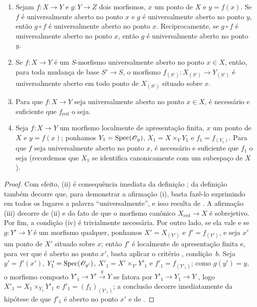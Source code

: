 \begin{proposition}[14.3.4]
\label{IV.14.3.4}
\begin{enumerate}[label=(\roman*)]
  \item Sejam $f:X\to Y$ e $g:Y\to Z$ dois morfismos, $x$ um ponto de $X$ e $y=f(x)$.
  Se $f$ é universalmente aberto no ponto $x$ e $g$ é universalmente aberto no ponto $y$, então $g\circ f$ é universalmente aberto no ponto $x$.
  Reciprocamente, se $g\circ f$ é universalmente aberto no ponto $x$, então $g$ é universalmente aberto no ponto $y$.

  \item Se $f:X\to Y$ é um $S$-morfismo universalmente aberto no ponto $x\in X$, então, para toda mudança de base $S'\to S$, o morfismo $f_{(S')}:X_{(S')}\to Y_{(S')}$ é universalmente aberto em todo ponto de $X_{(S')}$ situado sobre $x$.

  \item Para que $f:X\to Y$ seja universalmente aberto no ponto $x\in X$, é necessário e suficiente que $f_{\mathrm{red}}$ o seja.

  \item Seja $f:X\to Y$ um morfismo localmente de apresentação finita, $x$ um ponto de $X$ e $y=f(x)$; ponhamos $Y_1=\operatorname{Spec}(\mathscr{O}_y)$, $X_1=X\times_Y Y_1$ e $f_1=f_{(Y_1)}$.
  Para que $f$ seja universalmente aberto no ponto $x$, é necessário e suficiente que $f_1$ o seja (recordemos  que $X_1$ se identifica canonicamente com um subespaço de $X$).
\end{enumerate}
\end{proposition}

\begin{proof}
Com efeito, (ii) é consequência imediata da definição ; da definição também decorre que, para demonstrar a afirmação (i), basta fazê-lo suprimindo em todos os lugares a palavra “universalmente”, e isso resulta de .
A afirmação (iii) decorre de (ii) e do fato de que o morfismo canônico $X_{\mathrm{red}}\to X$ é sobrejetivo.
Por fim, a condição (iv) é trivialmente necessária.
Por outro lado, se ela vale e se $g:Y'\to Y$ é um morfismo qualquer, ponhamos $X'=X_{(Y')}$ e $f'=f_{(Y')}$, e seja $x'$ um ponto de $X'$ situado sobre $x$; então $f'$ é localmente de apresentação finita e, para ver que é aberto no ponto $x'$, basta aplicar o critério , condição~$b$.
Seja $y'=f'(x')$, $Y'_1=\operatorname{Spec}(\mathscr{O}_{y'})$, $X'_1=X'\times_{Y'}Y'_1$ e $f'_1=f_{(Y'_1)}$; como $g(y')=y$, o morfismo composto $Y'_1\to Y'\xrightarrow{g}Y$ se fatora por $Y'_1\to Y_1\to Y$ , logo $X'_1=X_1\times_{Y_1}Y'_1$ e $f'_1=(f_1)_{(Y'_1)}$; a conclusão decorre imediatamente da hipótese de que $f'_1$ é aberto no ponto $x'$ e de .
\end{proof}

